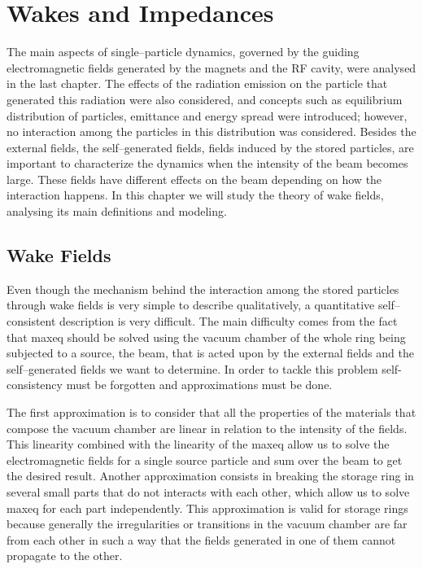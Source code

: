 \chapter{Wakes and Impedances}\label{cap:wakes_impedances}

    The main aspects of single--particle dynamics, governed by the guiding electromagnetic fields generated by the magnets and the RF cavity, were analysed in the last chapter. The effects of the radiation emission on the particle that generated this radiation were also considered, and concepts such as equilibrium distribution of particles, emittance and energy spread were introduced; however, no interaction among the particles in this distribution was considered. Besides the external fields, the self--generated fields, fields induced by the stored particles, are important to characterize the dynamics when the intensity of the beam becomes large. These fields have different effects on the beam depending on how the interaction happens. In this chapter we will study the theory of wake fields, analysing its main definitions and modeling.

\section{Wake Fields}\label{sec:wake_fields}

    Even though the mechanism behind the interaction among the stored particles through wake fields is very simple to describe qualitatively, a quantitative self--consistent description is very difficult. The main difficulty comes from the fact that \gls{maxeq} should be solved using the vacuum chamber of the whole ring being subjected to a source, the beam, that is acted upon by the external fields and the self--generated fields we want to determine. In order to tackle this problem self-consistency must be forgotten and approximations must be done.

    The first approximation is to consider that all the properties of the materials that compose the vacuum chamber are linear in relation to the intensity of the fields. This linearity combined with the linearity of the \gls{maxeq} allow us to solve the electromagnetic fields for a single source particle and sum over the beam to get the desired result. Another approximation consists in breaking the storage ring in several small parts that do not interacts with each other, which allow us to solve \gls{maxeq} for each part independently. This approximation is valid for storage rings because generally the irregularities or transitions in the vacuum chamber are far from each other in such a way that the fields generated in one of them cannot propagate to the other.

